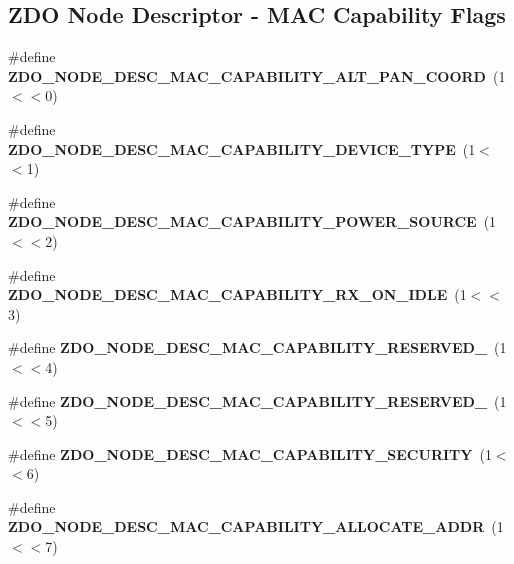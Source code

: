 \subsection*{Z\+DO Node Descriptor -\/ M\+AC Capability Flags}
\begin{DoxyCompactItemize}
\item 
\mbox{\label{group__zdo_ga6a1870a7d244cc148bc65fc2f5e78af7}} 
\#define {\bfseries Z\+D\+O\+\_\+\+N\+O\+D\+E\+\_\+\+D\+E\+S\+C\+\_\+\+M\+A\+C\+\_\+\+C\+A\+P\+A\+B\+I\+L\+I\+T\+Y\+\_\+\+A\+L\+T\+\_\+\+P\+A\+N\+\_\+\+C\+O\+O\+RD}~(1$<$$<$0)
\item 
\mbox{\label{group__zdo_ga0eb8cdab069e6e7fef3e092f685f8aee}} 
\#define {\bfseries Z\+D\+O\+\_\+\+N\+O\+D\+E\+\_\+\+D\+E\+S\+C\+\_\+\+M\+A\+C\+\_\+\+C\+A\+P\+A\+B\+I\+L\+I\+T\+Y\+\_\+\+D\+E\+V\+I\+C\+E\+\_\+\+T\+Y\+PE}~(1$<$$<$1)
\item 
\mbox{\label{group__zdo_ga50f63999d9dc3a726d3efa967d73b1b1}} 
\#define {\bfseries Z\+D\+O\+\_\+\+N\+O\+D\+E\+\_\+\+D\+E\+S\+C\+\_\+\+M\+A\+C\+\_\+\+C\+A\+P\+A\+B\+I\+L\+I\+T\+Y\+\_\+\+P\+O\+W\+E\+R\+\_\+\+S\+O\+U\+R\+CE}~(1$<$$<$2)
\item 
\mbox{\label{group__zdo_gabc8be41d8e8da1b6aa8e2acdfc12e36f}} 
\#define {\bfseries Z\+D\+O\+\_\+\+N\+O\+D\+E\+\_\+\+D\+E\+S\+C\+\_\+\+M\+A\+C\+\_\+\+C\+A\+P\+A\+B\+I\+L\+I\+T\+Y\+\_\+\+R\+X\+\_\+\+O\+N\+\_\+\+I\+D\+LE}~(1$<$$<$3)
\item 
\mbox{\label{group__zdo_ga3ddc671709736fef6059f858b1dc5237}} 
\#define {\bfseries Z\+D\+O\+\_\+\+N\+O\+D\+E\+\_\+\+D\+E\+S\+C\+\_\+\+M\+A\+C\+\_\+\+C\+A\+P\+A\+B\+I\+L\+I\+T\+Y\+\_\+\+R\+E\+S\+E\+R\+V\+E\+D\+\_}~(1$<$$<$4)
\item 
\mbox{\label{group__zdo_ga95eda5277af7fcade9ebadbc0b1bb5b0}} 
\#define {\bfseries Z\+D\+O\+\_\+\+N\+O\+D\+E\+\_\+\+D\+E\+S\+C\+\_\+\+M\+A\+C\+\_\+\+C\+A\+P\+A\+B\+I\+L\+I\+T\+Y\+\_\+\+R\+E\+S\+E\+R\+V\+E\+D\+\_}~(1$<$$<$5)
\item 
\mbox{\label{group__zdo_ga76652fe1ab732b4345e932f10a2e94f8}} 
\#define {\bfseries Z\+D\+O\+\_\+\+N\+O\+D\+E\+\_\+\+D\+E\+S\+C\+\_\+\+M\+A\+C\+\_\+\+C\+A\+P\+A\+B\+I\+L\+I\+T\+Y\+\_\+\+S\+E\+C\+U\+R\+I\+TY}~(1$<$$<$6)
\item 
\mbox{\label{group__zdo_ga5c906be729a9f9e0fb63ff600fcd9777}} 
\#define {\bfseries Z\+D\+O\+\_\+\+N\+O\+D\+E\+\_\+\+D\+E\+S\+C\+\_\+\+M\+A\+C\+\_\+\+C\+A\+P\+A\+B\+I\+L\+I\+T\+Y\+\_\+\+A\+L\+L\+O\+C\+A\+T\+E\+\_\+\+A\+D\+DR}~(1$<$$<$7)
\end{DoxyCompactItemize}

